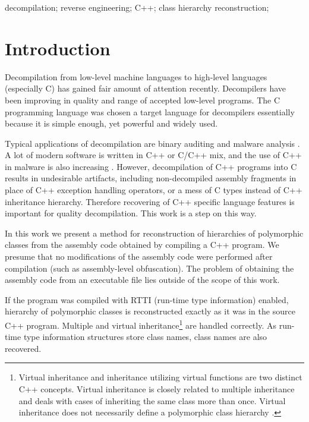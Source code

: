 \documentclass[10pt, conference]{IEEEtran}
\begin{document}
\begin{IEEEkeywords}
decompilation; reverse engineering; C++; class hierarchy reconstruction;

\end{IEEEkeywords}





\section{Introduction}
Decompilation from low-level machine languages to high-level
languages (especially C) has gained fair amount of attention
recently. Decompilers have been improving in quality and range
of accepted low-level programs. The C programming language
was chosen a target language for decompilers essentially
because it is simple enough, yet powerful and widely used.

Typical applications of decompilation are binary auditing
and malware analysis \cite{emmerik07}. A lot of modern software
is written in C++ or C/C++ mix, and the use of
C++ in malware is also increasing \cite{sabanal07}.
However, decompilation of C++
programs into C results in undesirable artifacts, including
non-decompiled assembly fragments in place of C++ exception
handling operators, or a mess of C types instead of C++
inheritance hierarchy. Therefore recovering of C++ specific
language features is important for quality decompilation.
This work is a step on this way.

In this work we present a method for reconstruction of
hierarchies of polymorphic classes from the assembly code obtained
by compiling a C++ program.
We presume
that no modifications of the assembly code were performed
after compilation (such as assembly-level obfuscation).
The problem of obtaining the assembly code from an executable file
lies outside of the scope of this work.

If the program was compiled with RTTI (run-time type information)
enabled, hierarchy of polymorphic classes is
reconstructed
exactly as it was in the source C++ program. Multiple and
virtual inheritance\footnote{Virtual
inheritance and inheritance utilizing virtual functions are
two distinct C++ concepts. Virtual inheritance is closely related
to multiple inheritance and deals with cases of inheriting the
same class more than once. Virtual inheritance does not necessarily
define a polymorphic class hierarchy \cite{stroustrup97}.}
are handled correctly. As run-time type
information structures store class names, class names are also
recovered.
\end{document}
